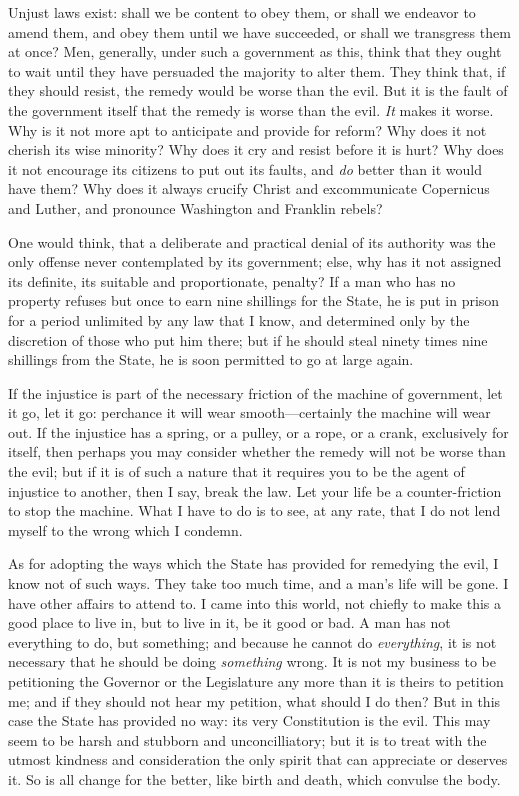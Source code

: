 \documentclass[12pt]{article}
\begin{document}
Unjust laws exist: shall we be content to obey them, or shall we
endeavor to amend them, and obey them until we have succeeded, or shall
we transgress them at once? Men, generally, under such a government as
this, think that they ought to wait until they have persuaded the
majority to alter them. They think that, if they should resist, the
remedy would be worse than the evil. But it is the fault of the
government itself that the remedy is worse than the evil. \emph{It}
makes it worse. Why is it not more apt to anticipate and provide for
reform? Why does it not cherish its wise minority? Why does it cry and
resist before it is hurt? Why does it not encourage its citizens to put
out its faults, and \emph{do} better than it would have them? Why does
it always crucify Christ and excommunicate Copernicus and Luther, and
pronounce Washington and Franklin rebels?

One would think, that a deliberate and practical denial of its authority
was the only offense never contemplated by its government; else, why has
it not assigned its definite, its suitable and proportionate, penalty?
If a man who has no property refuses but once to earn nine shillings for
the State, he is put in prison for a period unlimited by any law that I
know, and determined only by the discretion of those who put him there;
but if he should steal ninety times nine shillings from the State, he is
soon permitted to go at large again.

If the injustice is part of the necessary friction of the machine of
government, let it go, let it go: perchance it will wear
smooth---certainly the machine will wear out. If the injustice has a
spring, or a pulley, or a rope, or a crank, exclusively for itself, then
perhaps you may consider whether the remedy will not be worse than the
evil; but if it is of such a nature that it requires you to be the agent
of injustice to another, then I say, break the law. Let your life be a
counter-friction to stop the machine. What I have to do is to see, at
any rate, that I do not lend myself to the wrong which I condemn.

As for adopting the ways which the State has provided for remedying the
evil, I know not of such ways. They take too much time, and a man's life
will be gone. I have other affairs to attend to. I came into this world,
not chiefly to make this a good place to live in, but to live in it, be
it good or bad. A man has not everything to do, but something; and
because he cannot do \emph{everything}, it is not necessary that he
should be doing \emph{something} wrong. It is not my business to be
petitioning the Governor or the Legislature any more than it is theirs
to petition me; and if they should not hear my petition, what should I
do then? But in this case the State has provided no way: its very
Constitution is the evil. This may seem to be harsh and stubborn and
unconcilliatory; but it is to treat with the utmost kindness and
consideration the only spirit that can appreciate or deserves it. So is
all change for the better, like birth and death, which convulse the
body.
\end{document}
